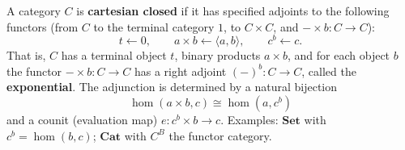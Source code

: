 A category $C$ is \textbf{cartesian closed} if it has specified adjoints to the following functors (from $C$ to the terminal category $1$, to $C \times C$, and $- \times b: C \to C$):
$$t \leftarrow 0, \qquad a \times b \leftarrow \langle a, b \rangle, \qquad c^b \leftarrow c.$$
That is, $C$ has a terminal object $t$, binary products $a \times b$, and for each object $b$ the functor $- \times b: C \to C$ has a right adjoint $(-)^b: C \to C$, called the \textbf{exponential}. The adjunction is determined by a natural bijection
$$\hom(a \times b, c) \cong \hom(a, c^b)$$
and a counit (evaluation map) $e: c^b \times b \to c$. Examples: $\mathbf{Set}$ with $c^b = \hom(b, c)$; $\mathbf{Cat}$ with $C^B$ the functor category.